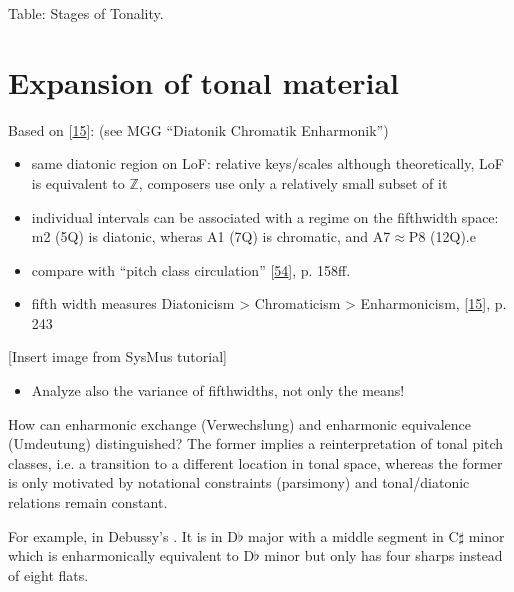 \documentclass[letterpaper,10pt,english]{sphinxmanual}
\begin{document}
\sphinxAtStartPar
Table: Stages of Tonality.


\section{Expansion of tonal material}
\label{\detokenize{5_notes:expansion-of-tonal-material}}
\sphinxAtStartPar
Based on {[}\hyperlink{cite.8_bibliography:id53}{15}{]}: (see MGG “Diatonik \textendash{}
Chromatik \textendash{} Enharmonik”)
\begin{itemize}
\item {} 
\sphinxAtStartPar
same diatonic region on LoF: relative keys/scales \sphinxhyphen{} although
theoretically, LoF is equivalent to \(\mathbb{Z}\), composers use
only a relatively small subset of it

\item {} 
\sphinxAtStartPar
individual intervals can be associated with a regime on the
fifth\sphinxhyphen{}width space: m2 (5Q) is diatonic, wheras A1 (7Q) is chromatic, and
A7\(\approx\)P8 (12Q).e

\item {} 
\sphinxAtStartPar
compare with “pitch class circulation” {[}\hyperlink{cite.8_bibliography:id49}{54}{]}, p. 158ff.

\item {} 
\sphinxAtStartPar
fifth width measures Diatonicism \sphinxhyphen{}\textgreater{} Chromaticism \sphinxhyphen{}\textgreater{} Enharmonicism, {[}\hyperlink{cite.8_bibliography:id53}{15}{]}, p. 243

\end{itemize}

\sphinxAtStartPar
{[}Insert image from SysMus tutorial{]}
\begin{itemize}
\item {} 
\sphinxAtStartPar
Analyze also the variance of fifth\sphinxhyphen{}widths, not only the means!

\end{itemize}

\sphinxAtStartPar
How can enharmonic exchange (Verwechslung) and enharmonic equivalence
(Umdeutung) distinguished? The former implies a reinterpretation of
tonal pitch classes, i.e. a transition to a different location in tonal
space, whereas the former is only motivated by notational constraints
(parsimony) and tonal/diatonic relations remain constant.

\sphinxAtStartPar
For example, in Debussy’s . It is in D\(\flat\)
major with a middle segment in C\(\sharp\) minor which is
enharmonically equivalent to D\(\flat\) minor but only has four
sharps instead of eight flats.
\end{document}
